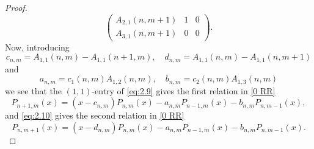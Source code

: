 \documentclass{amsart}
\theoremstyle{remark}
\numberwithin{equation}{section}
\begin{document}
\begin{proof}
\begin{equation}
\begin{pmatrix}
                  A_{2,1}(n,m+1) & 1 &  0 \\
                  A_{3,1}(n,m+1) & 0 &  0
                 \end{pmatrix}.
\end{equation}
Now, introducing
\begin{equation} \label{cd}
    c_{n,m} = A_{1,1}(n,m)-A_{1,1}(n+1,m), \quad
    d_{n,m} = A_{1,1}(n,m)-A_{1,1}(n,m+1)
\end{equation}
and
\begin{equation} \label{ab}   a_{n,m} = c_1(n,m)A_{1,2}(n,m), \quad b_{n,m} = c_2(n,m)A_{1,3}(n,m)\end{equation}
we see that the $(1,1)$-entry of \eqref{eq:2.9} gives the first relation in \eqref{0 RR}
$$ P_{n+1,m}(x) = (x-c_{n,m})P_{n,m}(x) - a_{n,m} P_{n-1,m}(x) - b_{n,m} P_{n,m-1}(x),$$
and \eqref{eq:2.10} gives the second relation in \eqref{0 RR}
$$P_{n,m+1}(x) = (x-d_{n,m})P_{n,m}(x) - a_{n,m} P_{n-1,m}(x) - b_{n,m} P_{n,m-1}(x). $$
\end{proof}
\end{document}
